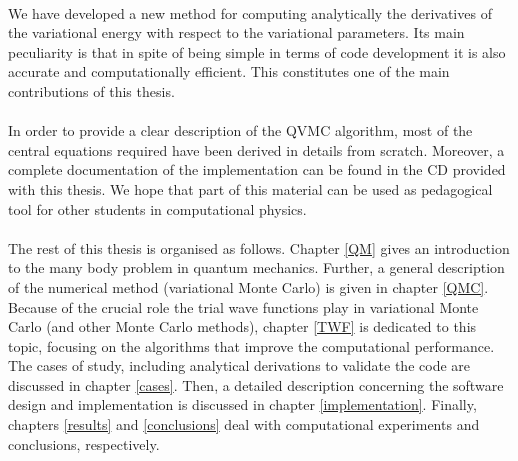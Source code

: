 \\
We have developed a new method for computing analytically the derivatives of the variational energy with respect to the variational parameters. Its main peculiarity is that in spite of being simple in terms of code development it is also accurate and computationally efficient. This constitutes one of the main contributions of this thesis.\\
\\
In order to provide a clear description of the QVMC algorithm, most of the central equations required have been derived in details from scratch. Moreover, a complete documentation of the implementation can be found in the CD provided with this thesis. We hope that part of this material can be used as pedagogical tool for other students in computational physics.\\
\\
The rest of this thesis is organised as follows. Chapter \ref{QM} gives an introduction to the many body problem in quantum mechanics. Further, a general description of the numerical method (variational Monte Carlo) is given in chapter \ref{QMC}. Because of the crucial role the trial wave functions play in variational Monte Carlo (and other Monte Carlo methods), chapter \ref{TWF} is dedicated to this topic, focusing on the algorithms that improve the computational performance. The cases of study, including analytical derivations to validate the code are discussed in chapter \ref{cases}. Then, a detailed description concerning the software design and implementation is discussed in chapter \ref{implementation}. Finally, chapters \ref{results} and \ref{conclusions} deal with computational experiments and conclusions, respectively. 

\clearemptydoublepage

